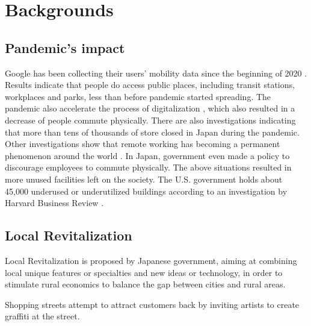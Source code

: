 \chapter{Backgrounds} \label{ch:2}

\section{Pandemic's impact}

Google has been collecting their users' mobility data since the beginning of 2020 \cite{googlemobilityreports} \cite{ourworldindata_2020}.
Results indicate that people do access public places, including transit stations, workplaces and parks, less than before pandemic started spreading.
The pandemic also accelerate the process of digitalization \cite{amankwah-amoah_khan_wood_knight_2021}, which also resulted in a decrease of people commute physically.
There are also investigations indicating that more than tens of thousands of store closed in Japan during the pandemic.
Other investigations show that remote working has becoming a permanent phenomenon around the world \cite{saad_wigert_2021}.
In Japan, government even made a policy to discourage employees to commute physically.
The above situations resulted in more unused facilities left on the society.
The U.S. government holds about 45,000 underused or underutilized buildings according to an investigation by Harvard Business Review \cite{hounsell_2020}.

\section{Local Revitalization}
Local Revitalization is proposed by Japanese government, aiming at combining local unique features or specialties and new ideas or technology,
in order to stimulate rural economics to balance the gap between cities and rural areas.

Shopping streets attempt to attract customers back by inviting artists to create graffiti at the street.


